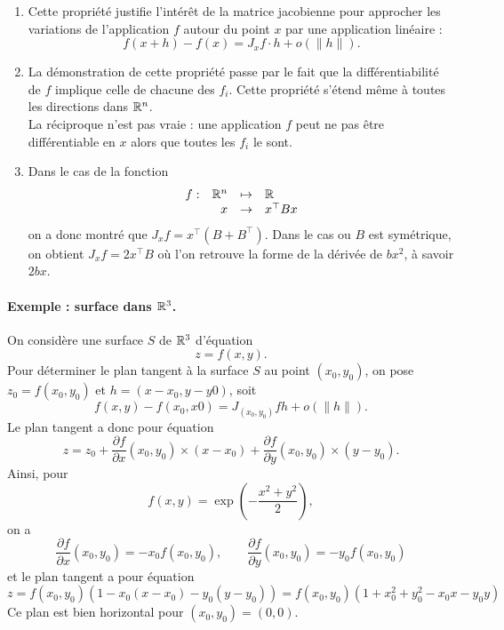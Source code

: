 \remark
\begin{enumerate}
  \item Cette propriété justifie l'intérêt de la matrice jacobienne pour approcher les variations de l'application $f$ autour du point $x$ par une application linéaire : 
  $$
  f(x+h) - f(x) = J_xf \cdot h + o(\|h\|).
  $$
  \item La démonstration de cette propriété passe par le fait que la différentiabilité de $f$ implique celle de chacune des $f_i$. Cette propriété s'étend même à toutes les directions dans $\mathbb{R}^n$. \\
  La réciproque n'est pas vraie : une application $f$ peut ne pas être différentiable en $x$ alors que toutes les $f_i$ le sont.
  \item Dans le cas de la fonction
  $$
  \begin{array}{rrcl}
    f : & \mathbb{R}^n & \mapsto & \mathbb{R} \\
    & x & \rightarrow & x^\top B x
  \end{array}
  $$
  on a donc montré que $J_x f = x^\top (B + B^\top)$. Dans le cas ou $B$ est symétrique, on obtient $J_x f = 2 x^\top B$ où l'on retrouve la forme de la dérivée de $bx^2$, à savoir $2 bx$.

\end{enumerate}

\paragraph*{Exemple : surface dans $\mathbb{R}^3$.}
On considère une surface $S$ de $\mathbb{R}^3$ d'équation
$$
z = f(x, y).
$$
Pour déterminer le plan tangent à la surface $S$ au point $(x_0, y_0)$, on pose $z_0 = f(x_0, y_0)$ et $h = (x-x_0, y-y0)$, soit 
$$
f(x, y) - f(x_0, x0) = J_{(x_0, y_0)} f h + o(\|h\|).
$$
Le plan tangent a donc pour équation
$$
z = z_0 + \frac{\partial f}{\partial x}(x_0, y_0) \times (x-x_0) + \frac{\partial f}{\partial y}(x_0, y_0) \times (y-y_0).
$$
Ainsi, pour
$$
f(x, y) = \exp\left(-\frac{x^2 + y^2}{2}\right),
$$
on a 
$$
\frac{\partial f}{\partial x}(x_0, y_0) = - x_0 f(x_0, y_0), 
\qquad
\frac{\partial f}{\partial y}(x_0, y_0) = - y_0 f(x_0, y_0)
$$
et le plan tangent a pour équation
$$
z 
= f(x_0, y_0)(1 - x_0 (x-x_0) - y_0 (y-y_0))
= f(x_0, y_0)(1 + x_0^2 + y_0^2 - x_0 x - y_0 y)
$$
Ce plan est bien horizontal pour $(x_0, y_0) = (0, 0)$.

